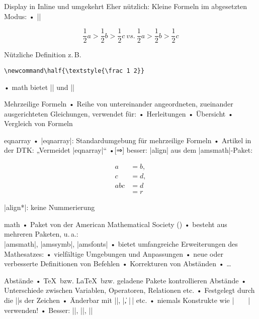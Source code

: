 \begin{frame}[fragile]{Display in Inline und umgekehrt}
Eher nützlich: Kleine Formeln im abgesetzten Modus:
• |\textstyle|
\•
\begin{LTXexample}[pos=b,rframe={}]
\[\frac 12 a > \frac 12 b > \frac 12 c \ vs. \
{ \textstyle \frac 12 a  > \frac 12 b > \frac 12 c}\]
\end{LTXexample}
\pause
Nützliche Definition z.\,B.
\begin{lstlisting}
\newcommand\half{\textstyle{\frac 1 2}}
\end{lstlisting}
• \AMS{}math bietet |\tfrac| und |\dfrac|
\•
\end{frame}

\begin{frame}{Mehrzeilige Formeln}
• Reihe von untereinander angeordneten, zueinander ausgerichteten Gleichungen, verwendet für:
• Herleitungen
• Übersicht
• Vergleich von Formeln
\• 
\end{frame}

\begin{frame}[fragile]{eqnarray}
• |eqnarray|: Standardumgebung für mehrzeilige Formeln
• Artikel in der DTK: „Vermeidet |eqnarray|“
•[⇒] besser: |align| aus dem |amsmath|-Paket:
\•
\begin{LTXexample}
\begin{align}
a &= b,\\
c &= d,\\
abc &= d\\
&= r
\end{align}
\end{LTXexample}
|{align*}|: keine Nummerierung
\end{frame}

\begin{frame}[fragile]{\AMS{}math}
• Paket von der American Mathematical Society (\AMS)
• besteht aus mehreren Paketen, u.\,a.:\\%
|amsmath|, |amssymb|, |amsfonts|%
• bietet umfangreiche Erweiterungen des Mathesatzes:
• vielfältige Umgebungen und Anpassungen
• neue oder verbesserte Definitionen von Befehlen
• Korrekturen von Abständen
• …
\•
\end{frame}

\begin{frame}[fragile]{Abstände}
• \TeX\ bzw. \LaTeX\ bzw. geladene Pakete kontrollieren Abstände
• Unterschiede zwischen Variablen, Operatoren, Relationen etc.
• Festgelegt durch die |\mathcode|s der Zeichen
• Änderbar mit |\kern|, |\|, |\,| etc.
• \alert{niemals} Konstrukte wie |\ \ \ \ | verwenden!
• Besser: |\quad|, |\qquad|, |\hspace{1em}|
\•
\end{frame}


